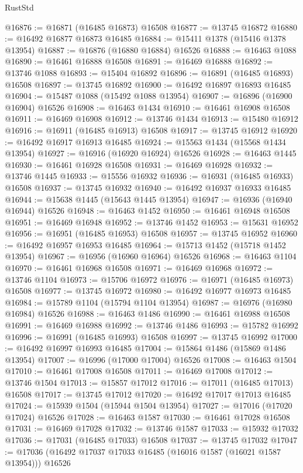 \begin{lexlean}{RustStd}
\begin{coremodule}
@16876 := @16871 (@16485 @16873) @16508
@16877 := @13745 @16872
@16880 := @16492 @16877 @16873 @16485
@16884 := @15411 @1378 (@15416 @1378 @13954)
@16887 := @16876 (@16880 @16884) @16526
@16888 := @16463 @1088
@16890 := @16461 @16888 @16508
@16891 := @16469 @16888
@16892 := @13746 @1088
@16893 := @15404 @16892
@16896 := @16891 (@16485 @16893) @16508
@16897 := @13745 @16892
@16900 := @16492 @16897 @16893 @16485
@16904 := @15487 @1088 (@15492 @1088 @13954)
@16907 := @16896 (@16900 @16904) @16526
@16908 := @16463 @1434
@16910 := @16461 @16908 @16508
@16911 := @16469 @16908
@16912 := @13746 @1434
@16913 := @15480 @16912
@16916 := @16911 (@16485 @16913) @16508
@16917 := @13745 @16912
@16920 := @16492 @16917 @16913 @16485
@16924 := @15563 @1434 (@15568 @1434 @13954)
@16927 := @16916 (@16920 @16924) @16526
@16928 := @16463 @1445
@16930 := @16461 @16928 @16508
@16931 := @16469 @16928
@16932 := @13746 @1445
@16933 := @15556 @16932
@16936 := @16931 (@16485 @16933) @16508
@16937 := @13745 @16932
@16940 := @16492 @16937 @16933 @16485
@16944 := @15638 @1445 (@15643 @1445 @13954)
@16947 := @16936 (@16940 @16944) @16526
@16948 := @16463 @1452
@16950 := @16461 @16948 @16508
@16951 := @16469 @16948
@16952 := @13746 @1452
@16953 := @15631 @16952
@16956 := @16951 (@16485 @16953) @16508
@16957 := @13745 @16952
@16960 := @16492 @16957 @16953 @16485
@16964 := @15713 @1452 (@15718 @1452 @13954)
@16967 := @16956 (@16960 @16964) @16526
@16968 := @16463 @1104
@16970 := @16461 @16968 @16508
@16971 := @16469 @16968
@16972 := @13746 @1104
@16973 := @15706 @16972
@16976 := @16971 (@16485 @16973) @16508
@16977 := @13745 @16972
@16980 := @16492 @16977 @16973 @16485
@16984 := @15789 @1104 (@15794 @1104 @13954)
@16987 := @16976 (@16980 @16984) @16526
@16988 := @16463 @1486
@16990 := @16461 @16988 @16508
@16991 := @16469 @16988
@16992 := @13746 @1486
@16993 := @15782 @16992
@16996 := @16991 (@16485 @16993) @16508
@16997 := @13745 @16992
@17000 := @16492 @16997 @16993 @16485
@17004 := @15864 @1486 (@15869 @1486 @13954)
@17007 := @16996 (@17000 @17004) @16526
@17008 := @16463 @1504
@17010 := @16461 @17008 @16508
@17011 := @16469 @17008
@17012 := @13746 @1504
@17013 := @15857 @17012
@17016 := @17011 (@16485 @17013) @16508
@17017 := @13745 @17012
@17020 := @16492 @17017 @17013 @16485
@17024 := @15939 @1504 (@15944 @1504 @13954)
@17027 := @17016 (@17020 @17024) @16526
@17028 := @16463 @1587
@17030 := @16461 @17028 @16508
@17031 := @16469 @17028
@17032 := @13746 @1587
@17033 := @15932 @17032
@17036 := @17031 (@16485 @17033) @16508
@17037 := @13745 @17032
@17047 := @17036 (@16492 @17037 @17033 @16485 (@16016 @1587 (@16021 @1587 @13954))) @16526

\end{coremodule}
\end{lexlean}

